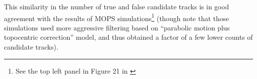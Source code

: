 This similarity in the number of true and false candidate tracks is in good
agreement with the results of MOPS simulations\footnote{See the top left panel
in Figure 21 in \citet{LDM-156}} (though note that those simulations used more aggressive filtering
based on ``parabolic motion plus topocentric correction'' model, and thus obtained a factor of a few
lower counts of candidate tracks).
